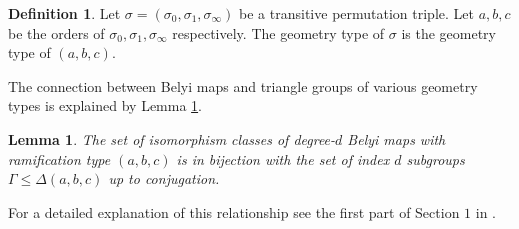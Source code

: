 \documentclass{dcthesis}
\newcommand{\defi}[1]{\textsf{#1}}
\newcommand{\mm}[1]{{\color{blue} \sf MM: [#1]}}
\numberwithin{equation}{section}
\newtheorem{theorem}[equation]{Theorem}
\newtheorem{prop}[equation]{Proposition}
\newtheorem{lemma}[equation]{Lemma}
\theoremstyle{definition}
\newtheorem{definition}[equation]{Definition}
\theoremstyle{remark}
\begin{document}
{{{\begin{definition}
      Let $\sigma=(\sigma_0,\sigma_1,\sigma_\infty)$ be a transitive permutation triple.
      Let $a,b,c$ be the orders of
      $\sigma_0,\sigma_1,\sigma_\infty$ respectively.
      The \defi{geometry type} of $\sigma$
      is the geometry type of $(a,b,c)$.
    \end{definition}
    The connection between Belyi maps
    and triangle groups
    of various geometry types is explained by Lemma
    \ref{lem:belyimapsandtrianglegroups}.
    \begin{lemma}
      \label{lem:belyimapsandtrianglegroups}
      The set of isomorphism classes of degree-$d$
      Belyi maps with ramification type $(a,b,c)$
      is in bijection with the set of
      index $d$ subgroups
      $\Gamma\leq\Delta(a,b,c)$
      up to conjugation.
    \end{lemma}
    For a detailed explanation of this relationship
    see the first part of Section $1$
    in \cite{KMSV}.
  }
}}
\end{document}
